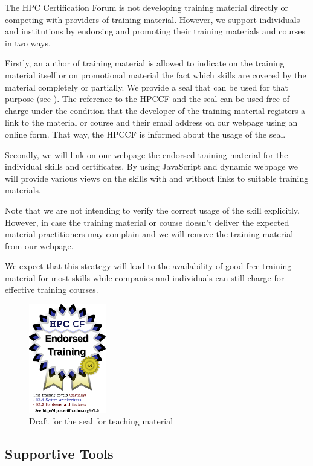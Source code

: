\documentclass[jocse]{jocseart}
\begin{document}
The HPC Certification Forum is not developing training material directly or competing with providers of training material.
However, we support individuals and institutions by endorsing and promoting their training materials and courses in two ways.

Firstly, an author of training material is allowed to indicate on the training material itself or on promotional material the fact
which skills are covered by the material completely or partially.
We provide a seal that can be used for that purpose (see ).
The reference to the HPCCF and the seal can be used free of charge under the condition that the developer of the training material
registers a link to the material or course and their email address on our webpage using an online form.
That way, the HPCCF is informed about the usage of the seal.

Secondly, we will link on our webpage the endorsed training material for the individual skills and certificates.
By using JavaScript and dynamic webpage we will provide various views on the skills with and without links to suitable training materials.

Note that we are not intending to verify the correct usage of the skill explicitly.
However, in case the training material or course doesn't deliver the expected material practitioners may complain and we will remove the training material from our webpage.

We expect that this strategy will lead to the availability of good free training material for most skills
while companies and individuals can still charge for effective training courses.

\begin{figure}
  \includegraphics[width=0.3\textwidth]{certified}
  \caption{Draft for the seal for teaching material}
  \label{fig:seal-teaching}
\end{figure}


\subsection{Supportive Tools}
\end{document}
